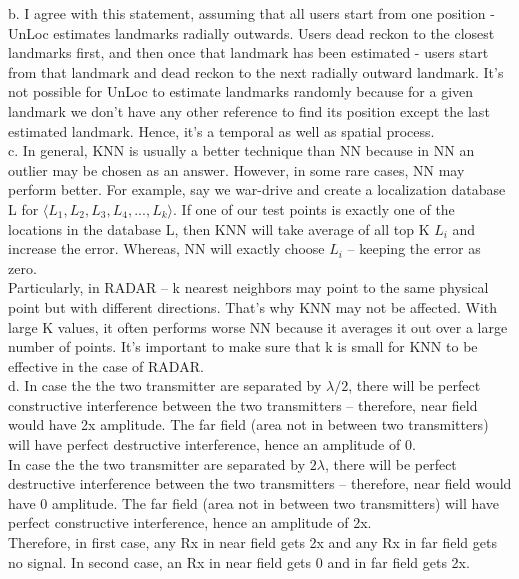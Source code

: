 \documentclass[a4paper]{article}
\begin{document}
b. I agree with this statement, assuming that all users start from one position - UnLoc estimates landmarks radially outwards. Users dead reckon to the closest landmarks first, and then once that landmark has been estimated - users start from that landmark and dead reckon to the next radially outward landmark. It's not possible for UnLoc to estimate landmarks randomly because for a given landmark we don't have any other reference to find its position except the last estimated landmark. Hence, it's a temporal as well as spatial process. \\

c. In general, KNN is usually a better technique than NN because in NN an outlier may be chosen as an answer. However, in some rare cases, NN may perform better. For example, say we war-drive and create a localization database L for $\langle L_{1}, L_{2}, L_{3}, L_{4}, ... ,L_{k} \rangle$. If one of our test points is exactly one of the locations in the database L, then KNN will take average of all top K $L_{i}$ and increase the error. Whereas, NN will exactly choose $L_{i}$ -- keeping the error as zero. \\

Particularly, in RADAR -- k nearest neighbors may point to the same physical point but with different directions. That's why KNN may not be affected. With large K values, it often performs worse NN because it averages it out over a large number of points. It's important to make sure that k is small for KNN to be effective in the case of RADAR.\\ 

d. In case the the two transmitter are separated by $\lambda/2$, there will be perfect constructive interference between the two transmitters -- therefore, near field would have 2x amplitude. The far field (area not in between two transmitters) will have perfect destructive interference, hence an amplitude of 0.\\

In case the the two transmitter are separated by $2\lambda$, there will be perfect destructive interference between the two transmitters -- therefore, near field would have 0 amplitude. The far field (area not in between two transmitters) will have perfect constructive interference, hence an amplitude of 2x.\\

Therefore, in first case, any Rx in near field gets 2x and any Rx in far field gets no signal. In second case, an Rx in near field gets 0 and in far field gets 2x. \\
\end{document}
